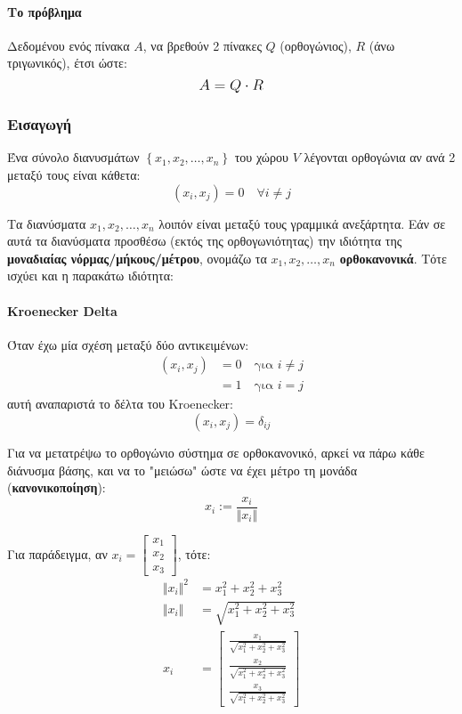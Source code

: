 \documentclass[11pt,a4paper,notitlepage,fleqn,final]{article}
\begin{document}
\paragraph{Το πρόβλημα}
Δεδομένου ενός πίνακα \( A \), να βρεθούν 2 πίνακες
\( Q \) (ορθογώνιος), \( R \) (άνω τριγωνικός), έτσι ώστε:
\[
\mathlarger{A = Q \cdot R}
\]

\subsubsection{Εισαγωγή}
Ένα σύνολο διανυσμάτων \( \left\lbrace x_1,x_2,\dots,
x_n \right\rbrace \) του χώρου \( V \) λέγονται ορθογώνια αν ανά
2 μεταξύ τους είναι κάθετα:
\[
(x_i,x_j) = 0 \quad \forall i \neq j
\]

Τα διανύσματα \( x_1,x_2,\dots, x_n \) λοιπόν είναι μεταξύ τους
γραμμικά ανεξάρτητα. Εάν σε αυτά τα διανύσματα προσθέσω (εκτός
της ορθογωνιότητας) την ιδιότητα της
\textbf{μοναδιαίας νόρμας/μήκους/μέτρου}, ονομάζω τα \( x_1,x_2,
\dots, x_n \) \textbf{ορθοκανονικά}. Τότε ισχύει και η παρακάτω
ιδιότητα:

\paragraph{Kroenecker Delta}

Όταν έχω μία σχέση μεταξύ δύο αντικειμένων:
\begin{align*}
	(x_i,x_j) &= 0 \quad \text{για } i \neq j \\
	          &= 1 \quad \text{για } i = j
\end{align*}
αυτή αναπαριστά το δέλτα του Kroenecker:
\[
(x_i,x_j) = \delta_{ij}
\]

Για να μετατρέψω το ορθογώνιο σύστημα σε ορθοκανονικό, αρκεί
να πάρω κάθε διάνυσμα βάσης, και να το "μειώσω" ώστε να έχει
μέτρο τη μονάδα (\textbf{κανονικοποίηση}):
\[
x_i := \frac{x_i}{\Vert x_i \Vert}
\]

Για παράδειγμα, αν \( x_i=\left[\begin{matrix}
x_1\\x_2\\x_3
\end{matrix}\right] \), τότε:
\begin{align*}
	\Vert x_i \Vert^2 &= x_1^2+x_2^2+x_3^2 \\
	\Vert x_i \Vert &= \sqrt{x_1^2+x_2^2+x_3^2} \\
	x_i &= \left[
	\begin{matrix}
	\frac{x_1}{\sqrt{x_1^2+x_2^2+x_3^2}} \\
	\frac{x_2}{\sqrt{x_1^2+x_2^2+x_3^2}} \\
	\frac{x_3}{\sqrt{x_1^2+x_2^2+x_3^2}}
	\end{matrix}
	\right]
\end{align*}
\end{document}
